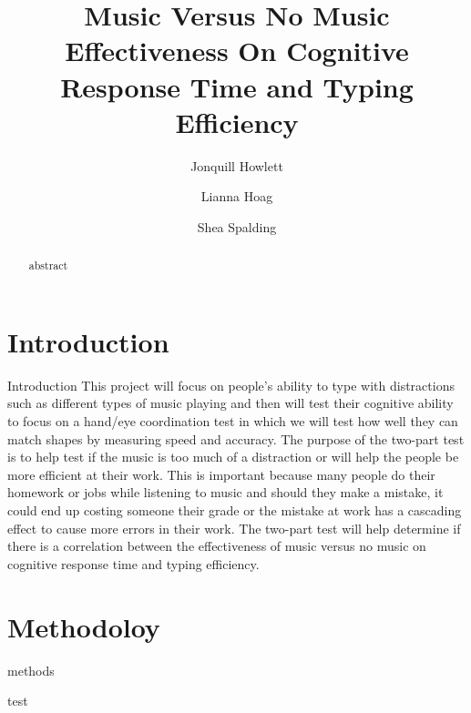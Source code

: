 \documentclass[sigconf]{acmart}
\begin{document}
\title{Music Versus No Music Effectiveness On Cognitive Response Time and Typing Efficiency}

\author{Jonquill Howlett}

\author{Lianna Hoag}

\author{Shea Spalding}

\renewcommand{\shortauthors}{J. Howlett} %

\begin{abstract}
abstract
\end{abstract}

\maketitle

\section{Introduction}
Introduction
This project will focus on people’s ability to type with distractions such as different types of music playing and then will test their cognitive ability to focus on a hand/eye coordination test in which we will test how well they can match shapes by measuring speed and accuracy. The purpose of the two-part test is to help test if the music is too much of a distraction or will help the people be more efficient at their work. This is important because many people do their homework or jobs while listening to music and should they make a mistake, it could end up costing someone their grade or the mistake at work has a cascading effect to cause more errors in their work. The two-part test will help determine if there is a correlation between the effectiveness of music versus no music on cognitive response time and typing efficiency.

\section{Methodoloy}
methods


test\cite{AudioDistractionsAshley}



\end{document}
